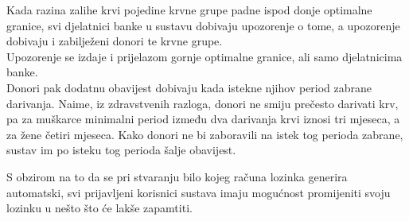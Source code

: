             \par{
            Kada razina zalihe krvi pojedine krvne grupe padne ispod donje optimalne granice, svi djelatnici banke u sustavu dobivaju upozorenje o tome, a upozorenje dobivaju i zabilježeni donori te krvne grupe.\\
            Upozorenje se izdaje i prijelazom gornje optimalne granice, ali samo djelatnicima banke. \\
            Donori pak dodatnu obavijest dobivaju kada istekne njihov period zabrane darivanja. Naime, iz zdravstvenih razloga, donori ne smiju prečesto darivati krv, pa za muškarce minimalni period između dva darivanja krvi iznosi tri mjeseca, a za žene četiri mjeseca. Kako donori ne bi zaboravili na istek tog perioda zabrane, sustav im po isteku tog perioda šalje obavijest.
            }
            \par{
            S obzirom na to da se pri stvaranju bilo kojeg računa lozinka generira automatski, svi prijavljeni korisnici sustava imaju mogućnost promijeniti svoju lozinku u nešto što će lakše zapamtiti.
            }
        
